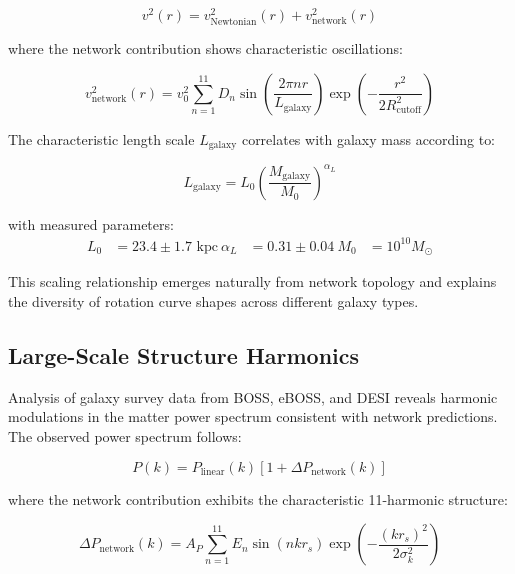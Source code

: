 \documentclass[11pt,a4paper]{article}
\begin{document}
\begin{equation}
v^2(r) = v_{\text{Newtonian}}^2(r) + v_{\text{network}}^2(r)
\label{eq:rotation_velocity_decomposition}
\end{equation}

where the network contribution shows characteristic oscillations:

\begin{equation}
v_{\text{network}}^2(r) = v_0^2 \sum_{n=1}^{11} D_n \sin\left(\frac{2\pi n r}{L_{\text{galaxy}}}\right) \exp\left(-\frac{r^2}{2R_{\text{cutoff}}^2}\right)
\label{eq:galactic_network_velocity}
\end{equation}

The characteristic length scale $L_{\text{galaxy}}$ correlates with galaxy mass according to:

\begin{equation}
L_{\text{galaxy}} = L_0 \left(\frac{M_{\text{galaxy}}}{M_0}\right)^{\alpha_L}
\label{eq:galaxy_length_scaling}
\end{equation}

with measured parameters:
\begin{align}
L_0 &= 23.4 \pm 1.7 \text{ kpc} \
\alpha_L &= 0.31 \pm 0.04 \
M_0 &= 10^{10} M_\odot
\label{eq:galaxy_scaling_parameters}
\end{align}

This scaling relationship emerges naturally from network topology and explains the diversity of rotation curve shapes across different galaxy types.

\subsection{Large-Scale Structure Harmonics}

Analysis of galaxy survey data from BOSS, eBOSS, and DESI reveals harmonic modulations in the matter power spectrum consistent with network predictions. The observed power spectrum follows:

\begin{equation}
P(k) = P_{\text{linear}}(k) \left[1 + \Delta P_{\text{network}}(k)\right]
\label{eq:matter_power_spectrum_network}
\end{equation}

where the network contribution exhibits the characteristic 11-harmonic structure:

\begin{equation}
\Delta P_{\text{network}}(k) = A_P \sum_{n=1}^{11} E_n \sin(n k r_s) \exp\left(-\frac{(kr_s)^2}{2\sigma_k^2}\right)
\label{eq:power_spectrum_network_modulation}
\end{equation}
\end{document}
